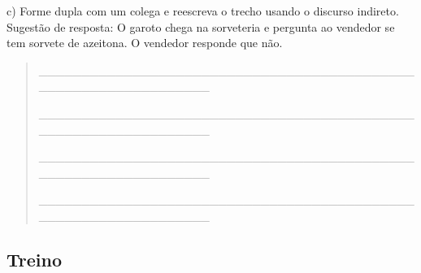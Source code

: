 c) Forme dupla com um colega e reescreva o trecho usando o discurso
indireto. Sugestão de resposta: O garoto chega na sorveteria e pergunta
ao vendedor se tem sorvete de azeitona. O vendedor responde que não.

\begin{quote}
\_\_\_\_\_\_\_\_\_\_\_\_\_\_\_\_\_\_\_\_\_\_\_\_\_\_\_\_\_\_\_\_\_\_\_\_\_\_\_\_\_\_\_\_\_\_\_\_\_\_\_\_\_\_\_\_\_\_\_\_\_\_\_\_

\_\_\_\_\_\_\_\_\_\_\_\_\_\_\_\_\_\_\_\_\_\_\_\_\_\_\_\_\_\_\_\_\_\_\_\_\_\_\_\_\_\_\_\_\_\_\_\_\_\_\_\_\_\_\_\_\_\_\_\_\_\_\_\_

\_\_\_\_\_\_\_\_\_\_\_\_\_\_\_\_\_\_\_\_\_\_\_\_\_\_\_\_\_\_\_\_\_\_\_\_\_\_\_\_\_\_\_\_\_\_\_\_\_\_\_\_\_\_\_\_\_\_\_\_\_\_\_\_

\_\_\_\_\_\_\_\_\_\_\_\_\_\_\_\_\_\_\_\_\_\_\_\_\_\_\_\_\_\_\_\_\_\_\_\_\_\_\_\_\_\_\_\_\_\_\_\_\_\_\_\_\_\_\_\_\_\_\_\_\_\_\_\_
\end{quote}

\subsection{Treino}\label{treino-5}

